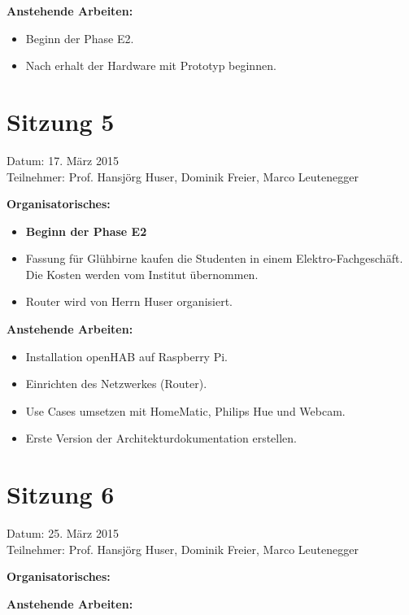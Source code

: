 	\textbf{Anstehende Arbeiten:}
	\begin{itemize}
		\item Beginn der Phase E2.
		\item Nach erhalt der Hardware mit Prototyp beginnen.
	\end{itemize}

\section*{Sitzung 5}
	Datum: 17. März 2015 \\
	Teilnehmer: Prof. Hansjörg Huser, Dominik Freier, Marco Leutenegger

	\textbf{Organisatorisches:}
	\begin{itemize}
		\item \textbf{Beginn der Phase E2}
		\item Fassung für Glühbirne kaufen die Studenten in einem Elektro-Fachgeschäft. Die Kosten werden vom Institut übernommen.
		\item Router wird von Herrn Huser organisiert.
	\end{itemize}

	\textbf{Anstehende Arbeiten:}
	\begin{itemize}
		\item Installation openHAB auf Raspberry Pi.
		\item Einrichten des Netzwerkes (Router).
		\item Use Cases umsetzen mit HomeMatic, Philips Hue und Webcam.
		\item Erste Version der Architekturdokumentation erstellen.
	\end{itemize}

\section*{Sitzung 6}
	Datum: 25. März 2015 \\
	Teilnehmer: Prof. Hansjörg Huser, Dominik Freier, Marco Leutenegger

	\textbf{Organisatorisches:}

	\textbf{Anstehende Arbeiten:}
	

